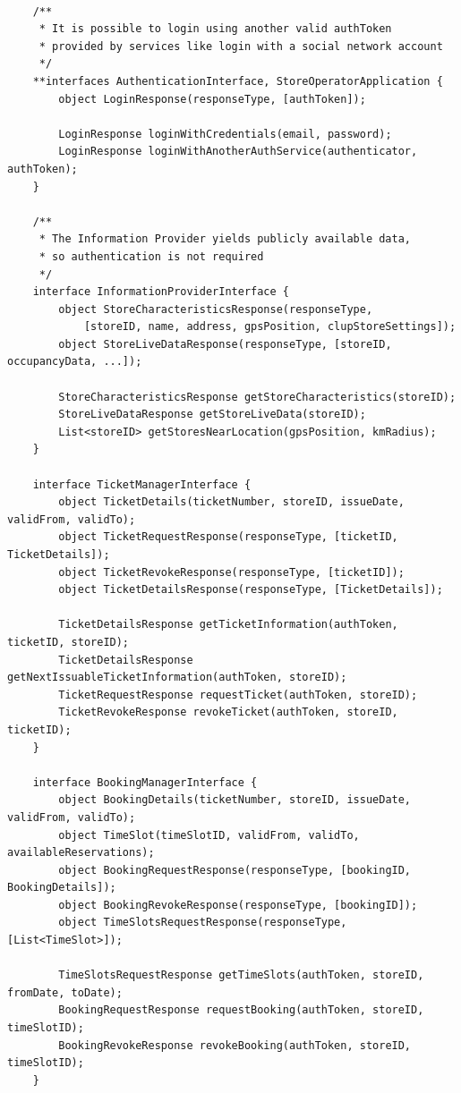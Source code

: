 \begin{lstlisting}
    
    /**
     * It is possible to login using another valid authToken 
     * provided by services like login with a social network account 
     */
    **interfaces AuthenticationInterface, StoreOperatorApplication {
        object LoginResponse(responseType, [authToken]);

        LoginResponse loginWithCredentials(email, password);
        LoginResponse loginWithAnotherAuthService(authenticator, authToken);
    }

    /**
     * The Information Provider yields publicly available data, 
     * so authentication is not required
     */
    interface InformationProviderInterface {
        object StoreCharacteristicsResponse(responseType, 
            [storeID, name, address, gpsPosition, clupStoreSettings]);
        object StoreLiveDataResponse(responseType, [storeID, occupancyData, ...]);

        StoreCharacteristicsResponse getStoreCharacteristics(storeID);
        StoreLiveDataResponse getStoreLiveData(storeID);
        List<storeID> getStoresNearLocation(gpsPosition, kmRadius);
    }

    interface TicketManagerInterface {
        object TicketDetails(ticketNumber, storeID, issueDate, validFrom, validTo);
        object TicketRequestResponse(responseType, [ticketID, TicketDetails]);
        object TicketRevokeResponse(responseType, [ticketID]);
        object TicketDetailsResponse(responseType, [TicketDetails]);

        TicketDetailsResponse getTicketInformation(authToken, ticketID, storeID);
        TicketDetailsResponse getNextIssuableTicketInformation(authToken, storeID);
        TicketRequestResponse requestTicket(authToken, storeID);
        TicketRevokeResponse revokeTicket(authToken, storeID, ticketID);
    }

    interface BookingManagerInterface {
        object BookingDetails(ticketNumber, storeID, issueDate, validFrom, validTo);
        object TimeSlot(timeSlotID, validFrom, validTo, availableReservations);
        object BookingRequestResponse(responseType, [bookingID, BookingDetails]);
        object BookingRevokeResponse(responseType, [bookingID]);
        object TimeSlotsRequestResponse(responseType, [List<TimeSlot>]);

        TimeSlotsRequestResponse getTimeSlots(authToken, storeID, fromDate, toDate);
        BookingRequestResponse requestBooking(authToken, storeID, timeSlotID);
        BookingRevokeResponse revokeBooking(authToken, storeID, timeSlotID);
    }


\end{lstlisting}
